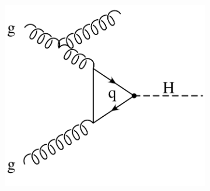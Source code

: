 \begin{figure}
\begin{subfigure}[]{0.3\textwidth}
	\caption{}
\end{subfigure}
~
\begin{subfigure}[]{0.3\textwidth}
	\includegraphics[width=\textwidth]{images/gluonfusion_real1.pdf}
	\caption{}
\end{subfigure}


\end{figure}
